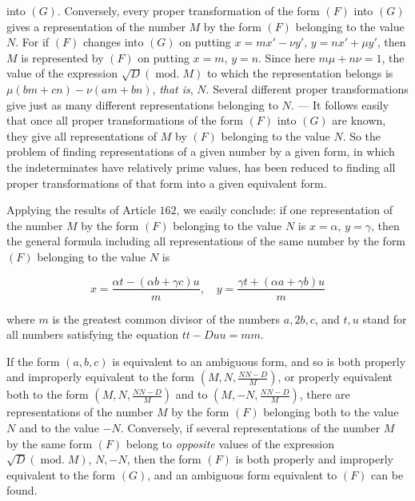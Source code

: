 into $(G)$. Conversely, every proper transformation of the form $(F)$ into $(G)$ gives a representation of the number $M$ by the form $(F)$ belonging to the value $N$. For if $(F)$ changes into $(G)$ on putting $x=mx'-\nu y'$, $y=nx'+\mu y'$, then $M$ is represented by $(F)$ on putting $x=m$, $y=n$. Since here $m\mu+n\nu=1$, the value of the expression $\surd D(\operatorname{mod.}M)$ to which the representation belongs is $\mu(bm+cn)-\nu(am+bn)$, \emph{that is}, $N$. Several different proper transformations give just as many different representations belonging to $N$. --- It follows easily that once all proper transformations of the form $(F)$ into $(G)$ are known, they give all representations of $M$ by $(F)$ belonging to the value $N$. So the problem of finding representations of a given number by a given form, in which the indeterminates have relatively prime values, has been reduced to finding all proper transformations of that form into a given equivalent form.

Applying the results of Article $162$, we easily conclude: if one representation of the number $M$ by the form $(F)$ belonging to the value $N$ is $x=\alpha$, $y=\gamma$, then the general formula including all representations of the same number by the form $(F)$ belonging to the value $N$ is

\[
x=\frac{\alpha t-(\alpha b+\gamma c)u}{m},\quad y=\frac{\gamma t+(\alpha a+\gamma b)u}{m}
\]

where $m$ is the greatest common divisor of the numbers $a,2b,c$, and $t,u$ stand for all numbers satisfying the equation $tt-Duu=mm$.


If the form $(a,b,c)$ is equivalent to an ambiguous form, and so is both properly and improperly equivalent to the form $(M,N,\frac{NN-D}{M})$, or properly equivalent both to the form $(M,N,\frac{NN-D}{M})$ and to $(M,-N,\frac{NN-D}{M})$, there are representations of the number $M$ by the form $(F)$ belonging both to the value $N$ and to the value $-N$. Conversely, if several representations of the number $M$ by the same form $(F)$ belong to \emph{opposite} values of the expression $\surd D(\operatorname{mod.}M)$, $N,-N$, then the form $(F)$ is both properly and improperly equivalent to the form $(G)$, and an ambiguous form equivalent to $(F)$ can be found.

